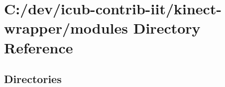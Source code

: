 \section{C\+:/dev/icub-\/contrib-\/iit/kinect-\/wrapper/modules Directory Reference}
\label{dir_e05d7e2b1ecd646af5bb94391405f3b5}
\subsection*{Directories}
\begin{DoxyCompactItemize}
\end{DoxyCompactItemize}
